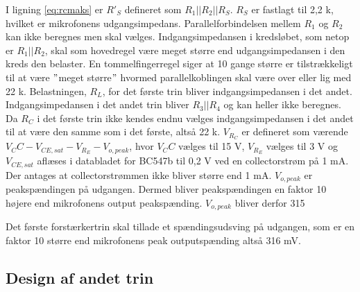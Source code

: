 I ligning \ref{eq:rcmaks} er $R'_S$ defineret som $R_1||R_2||R_S$. $R_S$ er fastlagt til 2,2 k\ohm, hvilket er mikrofonens udgangsimpedans. Parallelforbindelsen mellem $R_1$ og $R_2$ kan ikke beregnes men skal vælges. Indgangsimpedansen i kredsløbet, som netop er $R_1||R_2$, skal som hovedregel være meget større end udgangsimpedansen i den kreds den belaster. En tommelfingerregel siger at 10 gange større er tilstrækkeligt til at være $"$meget større$"$ hvormed parallelkoblingen skal være over eller lig med 22 k\ohm. 
Belastningen, $R_L$, for det første trin bliver indgangsimpedansen i det andet. Indgangsimpedansen i det andet trin bliver $R_3||R_4$ og kan heller ikke beregnes. Da $R_C$ i det første trin ikke kendes endnu vælges indgangsimpedansen i det andet til at være den samme som i det første, altså 22 k\ohm. 
$V_{R_C}$ er defineret som værende $V_CC - V_{CE,sat} - V_{R_E} - V_{o,peak}$, hvor $V_CC$ vælges til 15 V, $V_{R_E}$ vælges til 3 V og $V_{CE,sat}$ aflæses i databladet for BC547b til 0,2 V ved en collectorstrøm på 1 mA. Der antages at collectorstrømmen ikke bliver større end 1 mA. $V_{o,peak}$ er peakspændingen på udgangen. Dermed bliver peakspændingen en faktor 10 højere end mikrofonens output peakspænding. $V_{o,peak}$ bliver derfor 315


Det første forstærkertrin skal tillade et spændingsudsving på udgangen, som er en faktor 10 større end mikrofonens peak outputspænding altså 316 mV. 


\subsection*{Design af andet trin}



